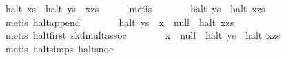 \begin{isabellebody}
\ {}halt\ xs\ {}\ halt\ {}ys\ {}\ x{}zs{}{}\isanewline
\ \ \ \ \isamarkupfalse%
\ metis\isanewline
\ \ \isamarkupfalse%
\ \isamarkupfalse%
\ {}{}{}{}\ {}\ halt\ ys\ {}\ halt\ {}x{}zs{}{}\isanewline
\ \ \ \ \isamarkupfalse%
\ {}metis\ halt{}append{}\isanewline
\ \ \isamarkupfalse%
\ \isamarkupfalse%
\ {}{}{}{}\ {}\ halt\ ys\ {}\ x\ {}{}\ null\ {}\ halt\ {}x{}zs{}{}\isanewline
\ \ \ \ \isamarkupfalse%
\ {}metis\ halt{}first\ skd{}mult{}assoc{}\isanewline
\ \ \isamarkupfalse%
\ \isamarkupfalse%
\ {}{}{}{}\ {}\ x\ {}{}\ null\ {}\ halt\ ys\ {}\ halt\ {}x{}zs{}{}\isanewline
\ \ \ \ \isamarkupfalse%
\ {}metis\ halt{}simps{}{}{}\ halt{}snoc{}\isanewline

\end{isabellebody}

